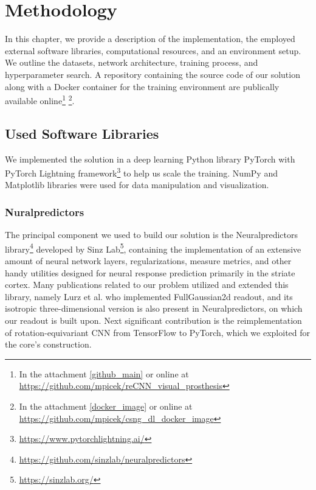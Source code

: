 \chapter{Methodology}\label{methodology}

In this chapter, we provide a description of the implementation, the employed external software libraries, computational resources, and an environment setup. We outline the datasets, network architecture, training process, and hyperparameter search. A repository containing the source code of our solution along with a Docker container for the training environment are publically available online\footnote{In the attachment \ref{github_main} or online at \url{https://github.com/mpicek/reCNN_visual_prosthesis}} \footnote{In the attachment \ref{docker_image} or online at \url{https://github.com/mpicek/csng_dl_docker_image}}.

\section{Used Software Libraries}

We implemented the solution in a deep learning Python library PyTorch \citep{paszke2019pytorch} with PyTorch Lightning framework\footnote{\url{https://www.pytorchlightning.ai/}} to help us scale the training. NumPy \citep{van2011numpy} and Matplotlib \citep{hunter2007matplotlib} libraries were used for data manipulation and visualization.

\subsection{Nuralpredictors}

The principal component we used to build our solution is the Neuralpredictors library\footnote{\url{https://github.com/sinzlab/neuralpredictors}} developed by Sinz Lab\footnote{\url{https://sinzlab.org/}}, containing the implementation of an extensive amount of neural network layers, regularizations, measure metrics, and other handy utilities designed for neural response prediction primarily in the striate cortex. Many publications related to our problem utilized and extended this library, namely Lurz et al.\citep{lurz2021generalization} who implemented FullGaussian2d readout, and its isotropic three-dimensional version is also present in Neuralpredictors, on which our readout is built upon. Next significant contribution is the reimplementation of rotation-equivariant CNN \citep{ecker2018rotation} from TensorFlow \citep{tensorflow2015-whitepaper} to PyTorch, which we exploited for the core’s construction.

